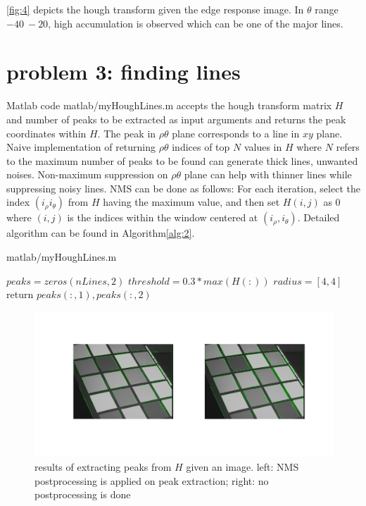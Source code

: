 \documentclass[extendedabs]{bmvc2k}
\begin{document}
\figurename{\ref{fig:4}} depicts the hough transform given the edge response image. In $\theta$ range $-40 ~ -20$, high accumulation
is observed which can be one of the major lines. 

\section*{problem 3: finding lines}

Matlab code matlab/myHoughLines.m accepts the hough transform matrix $H$ and number of peaks to be extracted as input
arguments and returns the peak coordinates within $H$. The peak in $\rho\theta$ plane corresponds to a line in $xy$ plane.
Naive implementation of returning $\rho\theta$ indices of top $N$ values in $H$ where $N$ refers to the maximum number of
peaks to be found can generate thick lines, unwanted noises. Non-maximum suppression on $\rho\theta$ plane can help with
thinner lines while suppressing noisy lines. NMS can be done as follows: For each iteration, select the index 
$(i_{\rho} i_{\theta})$ from $H$ having the maximum value, and then set $H(i, j)$ as $0$ where $(i, j)$ is the indices 
within the window centered at $(i_{\rho}, i_{\theta})$.
Detailed algorithm can be found in Algorithm\ref{alg:2}.

\begin{algorithm}
    \caption{matlab/myHoughLines.m}
    \label{alg:2}
    $peaks = zeros(nLines, 2)$\;
    $threshold = 0.3 * max(H(:))$\;
    $radius = [4, 4]$\;
    return $peaks(:, 1), peaks(:, 2)$\;
\end{algorithm}

\begin{figure}[h]
    \centering
    \includegraphics[width=\linewidth]{hw4_3_1}
    \caption{results of extracting peaks from $H$ given an image. 
    left: NMS postprocessing is applied on peak extraction; right: no postprocessing is done}
    \label{fig:5}
\end{figure}
\end{document}
